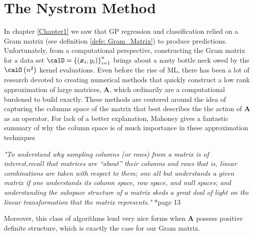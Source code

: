 \section{The Nystrom Method}\label{Chapter2}
In chapter \ref{Chapter1} we saw that GP regression and classification relied on a Gram matrix (see definition \ref{defe: Gram_Matrix}) to produce predictions. Unfortunately, from a computational perspective, constructing the Gram matrix for a data set $\calD = \left\{ \left( \bm{x}_i , y_{i} \right) \right\}_{i=1}^{n}$ brings about a nasty bottle neck owed by the $\calO \left( n^2 \right)$ kernel evaluations. Even before the rise of ML, there has been a lot of research devoted to creating numerical methods that quickly construct a low rank approximation of large matrices, $\bm{A}$, which ordinarily are a computational burdened to build exactly. These methods are centered around the idea of capturing the columns space of the matrix that best describes the the action of $\bm{A}$ as an operator. For lack of a better explanation, Mahoney gives a fantastic summary of why the column space is of much importance in these approximation techniques
\begin{center}
    \emph{"To understand why sampling columns (or rows) from a matrix is of interest,recall that matrices are “about” their columns and rows that is, linear combinations are taken with respect to them; one all but understands a given matrix if one understands its column space, row space, and null
        spaces; and understanding the subspace structure of a matrix sheds a great deal of light on the linear transformation that the matrix represents."} \cite{DBLP:journals/corr/abs-1104-5557}*{page 13}
\end{center}
Moreover, this class of algorithms lend very nice forms when $\bm{A}$ possess positive definite structure, which is exactly the case for our Gram matrix.
